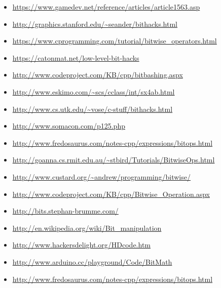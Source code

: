 \documentclass[11pt]{article}
\begin{document}
\begin{itemize}
\item \url{https://www.gamedev.net/reference/articles/article1563.asp}
\item \url{http://graphics.stanford.edu/\~seander/bithacks.html}
\item \url{https://www.cprogramming.com/tutorial/bitwise\_operators.html}
\item \url{https://catonmat.net/low-level-bit-hacks}
\item \url{http://www.codeproject.com/KB/cpp/bitbashing.aspx}
\item \url{http://www.eskimo.com/\~scs/cclass/int/sx4ab.html}
\item \url{http://www.cs.utk.edu/\~vose/c-stuff/bithacks.html}
\item \url{http://www.somacon.com/p125.php}
\item \url{http://www.fredosaurus.com/notes-cpp/expressions/bitops.html}
\item \url{http://goanna.cs.rmit.edu.au/\~stbird/Tutorials/BitwiseOps.html}
\item \url{http://www.custard.org/\~andrew/programming/bitwise/}
\item \url{http://www.codeproject.com/KB/cpp/Bitwise\_Operation.aspx}
\item \url{http://bits.stephan-brumme.com/}
\item \url{http://en.wikipedia.org/wiki/Bit\_manipulation}
\item \url{http://www.hackersdelight.org/HDcode.htm}
\item \url{http://www.arduino.cc/playground/Code/BitMath}
\item \url{http://www.fredosaurus.com/notes-cpp/expressions/bitops.html}
\end{itemize}
\end{document}
